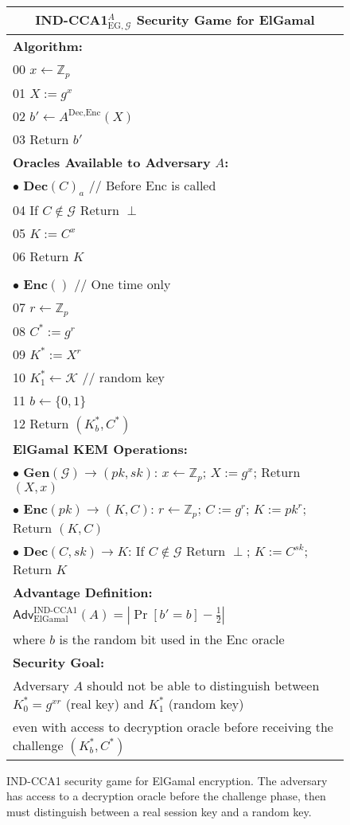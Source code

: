 \begin{figure}[H]
\centering
\footnotesize
\begin{tabular}{|p{15cm}|}
\hline
\multicolumn{1}{|c|}{\textbf{IND-CCA1$_{\text{EG},\mathcal{G}}^A$ Security Game for ElGamal}} \\
\hline
\textbf{Algorithm:} \\
00 $x \leftarrow \mathbb{Z}_p$ \\
01 $X := g^x$ \\
02 $b' \leftarrow A^{\text{Dec},\text{Enc}}(X)$ \\
03 Return $b'$ \\
\hline
\textbf{Oracles Available to Adversary } $A$\textbf{:} \\
$\bullet$ \textbf{Dec}$(C)_a$ // Before Enc is called \\
\phantom{$\bullet$} 04 If $C \notin \mathcal{G}$ Return $\perp$ \\
\phantom{$\bullet$} 05 $K := C^x$ \\
\phantom{$\bullet$} 06 Return $K$ \\
\\
$\bullet$ \textbf{Enc}$()$ // One time only \\
\phantom{$\bullet$} 07 $r \leftarrow \mathbb{Z}_p$ \\
\phantom{$\bullet$} 08 $C^* := g^r$ \\
\phantom{$\bullet$} 09 $K^* := X^r$ \\
\phantom{$\bullet$} 10 $K_1^* \leftarrow \mathcal{K}$ // random key \\
\phantom{$\bullet$} 11 $b \leftarrow \{0,1\}$ \\
\phantom{$\bullet$} 12 Return $(K_b^*, C^*)$ \\
\hline
\textbf{ElGamal KEM Operations:} \\
$\bullet$ \textbf{Gen}$(\mathcal{G}) \rightarrow (pk, sk)$: $x \leftarrow \mathbb{Z}_p$; $X := g^x$; Return $(X, x)$ \\
$\bullet$ \textbf{Enc}$(pk) \rightarrow (K, C)$: $r \leftarrow \mathbb{Z}_p$; $C := g^r$; $K := pk^r$; Return $(K, C)$ \\
$\bullet$ \textbf{Dec}$(C, sk) \rightarrow K$: If $C \notin \mathcal{G}$ Return $\perp$; $K := C^{sk}$; Return $K$ \\
\hline
\textbf{Advantage Definition:} \\
$\mathsf{Adv}^{\text{IND-CCA1}}_{\text{ElGamal}}(A) = \left|\Pr[b' = b] - \frac{1}{2}\right|$ \\
where $b$ is the random bit used in the Enc oracle \\
\hline
\textbf{Security Goal:} \\
Adversary $A$ should not be able to distinguish between $K_0^* = g^{xr}$ (real key) and $K_1^*$ (random key) \\
even with access to decryption oracle before receiving the challenge $(K_b^*, C^*)$ \\
\hline
\end{tabular}
\caption{IND-CCA1 security game for ElGamal encryption. The adversary has access to a decryption oracle before the challenge phase, then must distinguish between a real session key and a random key.}
\label{fig:indcca1-algorithm}
\end{figure}
